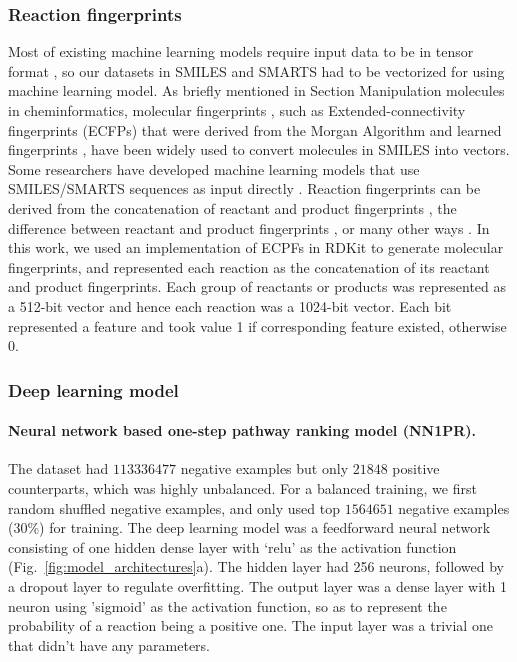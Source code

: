 \documentclass{article}
\begin{document}
\subsubsection{Reaction fingerprints}
\label{sec:SI-methods-RF}
Most of existing machine learning models require input data to be in tensor format \citep{geron2019hands, goodfellow2016deep, francois2017deep}, so our datasets in SMILES and SMARTS had to be vectorized for using machine learning model. 
As briefly mentioned in Section Manipulation molecules in cheminformatics, molecular fingerprints \citep{todeschini2008handbook}, such as Extended-connectivity fingerprints (ECFPs) \citep{rogers2010extended} that were derived from the Morgan Algorithm \citep{morgan1965generation} and learned fingerprints \citep{duvenaud2015convolutional, kearnes2016molecular},   have been widely used to convert molecules in SMILES into vectors.
Some researchers have developed machine learning models that use SMILES/SMARTS sequences as input directly \citep{liu2017retrosynthetic}.
Reaction fingerprints can be derived from the concatenation of reactant and product fingerprints \citep{wei2016neural}, the difference between reactant and product fingerprints \citep{kraut2013algorithm}, or many other ways \citep{kayala2011learning, kayala2012reactionpredictor}. 
In this work, we used an implementation of ECPFs in RDKit to generate molecular fingerprints, and represented each reaction as the concatenation of its reactant and product fingerprints. Each group of reactants or products was represented as a 512-bit vector and hence each reaction was a 1024-bit vector. Each bit represented a feature and took value 1 if corresponding feature existed, otherwise 0. 


\subsubsection{Deep learning model}
\paragraph{Neural network based one-step pathway ranking model (NN1PR).}
The dataset had $113336477$ negative examples but only $21848$ positive counterparts, which was highly unbalanced. For a balanced training, we first random shuffled negative examples, and only used top $1564651$ negative examples (30\%) for training. 
The deep learning model was a feedforward neural network consisting of one hidden dense layer with `relu' as the activation function \citep{goodfellow2016deep} (Fig.~\ref{fig:model_architectures}a). 
The hidden layer had 256 neurons, followed by a dropout layer to regulate overfitting.
The output layer was a dense layer with 1 neuron using 'sigmoid' as the activation function, so as to represent the probability of a reaction being a positive one. 
The input layer was a trivial one that didn't have any parameters.
\end{document}
